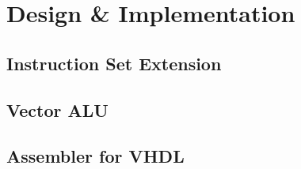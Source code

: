\section{Design \& Implementation}
\subsection{Instruction Set Extension}
\subsection{Vector ALU}
\subsection{Assembler for VHDL}
